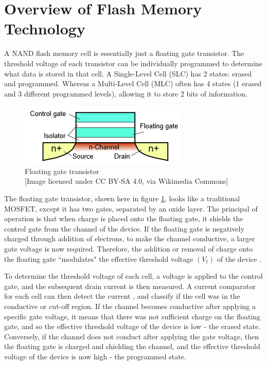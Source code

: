 \documentclass[11pt]{article}
\numberwithin{equation}{subsection}
\begin{document}
\section{Overview of Flash Memory Technology} \label{section:memtech}
A NAND flash memory cell is essentially just a floating gate transistor. The threshold voltage of each transistor can be individually programmed to determine what data is stored in that cell. A Single-Level Cell (SLC) has 2 states: erased and programmed. Whereas a Multi-Level Cell (MLC) often has 4 states (1 erased and 3 different programmed levels), allowing it to store 2 bits of information.
\begin{figure}[h]
\centering
\includegraphics[scale=0.65]{floating_gate_transistor}
\caption[]{Floating gate transistor\\ \footnotesize[Image licensed under CC BY-SA 4.0, via Wikimedia Commons]}
\label{figure:floating_gate}
\end{figure}

The floating gate transistor, shown here in figure \ref{figure:floating_gate}, looks like a traditional MOSFET, except it has two gates, separated by an oxide layer. The principal of operation is that when charge is placed onto the floating gate, it shields the control gate from the channel of the device. If the floating gate is negatively charged through addition of electrons, to make the channel conductive, a larger gate voltage is now required. Therefore, the addition or removal of charge onto the floating gate ``modulates" the effective threshold voltage $(V_t)$ of the device \cite{bez2003introduction}.

To determine the threshold voltage of each cell, a voltage is applied to the control gate, and the subsequent drain current is then measured. A current comparator for each cell can then detect the current \cite{DBLP:journals/corr/abs-1210-0149}, and classify if the cell was in the conductive or cut-off region. If the channel becomes conductive after applying a specific gate voltage, it means that there was not sufficient charge on the floating gate, and so the effective threshold voltage of the device is low - the erased state. Conversely, if the channel does not conduct after applying the gate voltage, then the floating gate is charged and shielding the channel, and the effective threshold voltage of the device is now high - the programmed state.
\end{document}
